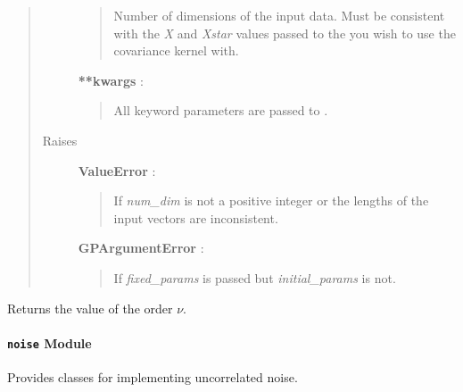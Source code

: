 \documentclass[letterpaper,10pt,english]{sphinxmanual}
\begin{document}
\begin{fulllineitems}
\begin{quote}
\begin{description}
\begin{quote}
Number of dimensions of the input data. Must be consistent with the \emph{X}
and \emph{Xstar} values passed to the {\hyperref[gptools:gptools.gaussian_process.GaussianProcess]{}}
you wish to use the covariance kernel with.
\end{quote}

\textbf{**kwargs} :
\begin{quote}

All keyword parameters are passed to {\hyperref[gptools.kernel:gptools.kernel.core.ChainRuleKernel]{}}.
\end{quote}

\item[{Raises }] \leavevmode
\textbf{ValueError} :
\begin{quote}

If \emph{num\_dim} is not a positive integer or the lengths of the input
vectors are inconsistent.
\end{quote}

\textbf{GPArgumentError} :
\begin{quote}

If \emph{fixed\_params} is passed but \emph{initial\_params} is not.
\end{quote}

\end{description}\end{quote}

\begin{fulllineitems}
\label{gptools.kernel:gptools.kernel.matern.MaternKernel.nu}
Returns the value of the order $\nu$.

\end{fulllineitems}


\end{fulllineitems}



\paragraph{\texttt{noise} Module}
\label{gptools.kernel:noise-module}\label{gptools.kernel:module-gptools.kernel.noise}
Provides classes for implementing uncorrelated noise.
\end{document}
